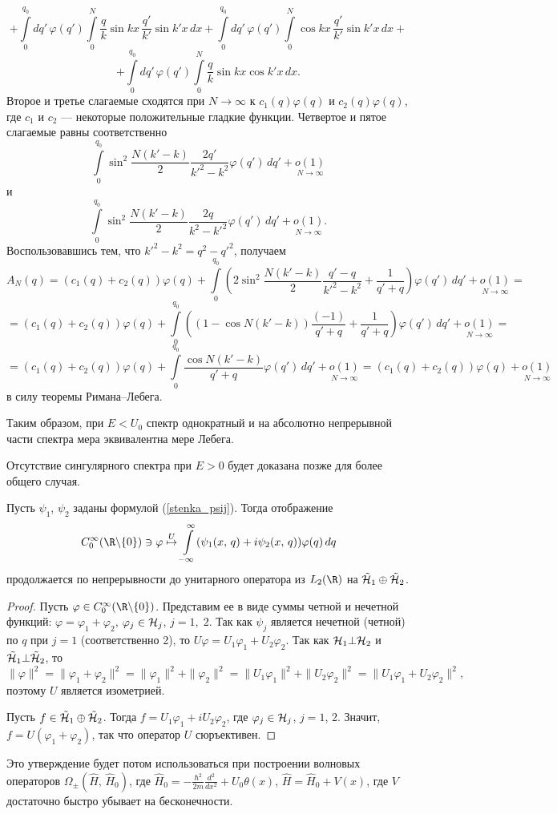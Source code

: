 \documentclass[a4paper
]{article}
\begin{document}
$$+\int \limits _0^{q_0}dq'\, \varphi(q')\int \limits_0^N \frac{q}{k}
\sin kx\, \frac{q'}{k'}\sin k'x\, dx+\int \limits _0^{q_0}dq'\, \varphi(q')
\int \limits_0^N \cos kx\, \frac{q'}{k'}\sin k'x\, dx+$$ $$+\int \limits
_0^{q_0}dq'\, \varphi(q')\int \limits_0^N \frac{q}{k}\sin kx\cos k'x\, dx.$$
Второе и третье слагаемые сходятся
при $N\rightarrow \infty$ к $c_1(q)\varphi(q)$ и $c_2(q)\varphi(q)$,
где $c_1$ и $c_2$ --- некоторые положительные гладкие функции.
Четвертое и пятое слагаемые равны соответственно $$\int \limits_0^{q_0}
\sin^2\frac{N(k'-k)}{2}\frac{2q'}{k'^2-k^2}\varphi(q')\, dq'+\underset{N\rightarrow
\infty}{o(1)}$$ и $$\int \limits_0^{q_0}\sin^2\frac{N(k'-k)}{2}
\frac{2q}{k^2-k'^2}\varphi(q')\, dq'+\underset{N\rightarrow \infty}{o(1)}.$$
Воспользовавшись тем, что $k'^2-k^2=q^2-q'^2$, получаем $$A_N(q)=(c_1(q)+c_2(q))
\varphi(q)+\int \limits_0^{q_0}\left(
2\sin^2\frac{N(k'-k)}{2}\frac{q'-q}{k'^2-k^2}+\frac{1}{q'+q}\right)
\varphi(q')\, dq'+\underset{N\rightarrow \infty}{o(1)}=$$ $$=(c_1(q)+c_2(q))
\varphi(q)+\int \limits_0^{q_0}\left((1-\cos N(k'-k))\frac{(-1)}{q'+q}+
\frac{1}{q'+q}\right)\varphi(q')\, dq'+\underset{N\rightarrow \infty}{o(1)}=$$
$$=(c_1(q)+c_2(q))\varphi(q)+\int \limits_0^{q_0}\frac{\cos N(k'-k)}{q'+q}\varphi(q')
\, dq'+\underset{N\rightarrow \infty}{o(1)}=(c_1(q)+c_2(q))\varphi(q)
+\underset{N\rightarrow \infty}{o(1)}$$ в силу теоремы Римана--Лебега. \par
Таким образом, при $E<U_0$ спектр однократный и на абсолютно непрерывной
части спектра мера эквивалентна мере Лебега. \par
Отсутствие сингулярного спектра при $E>0$ будет доказана позже для
более общего случая.
\begin{Sta}
\label{utv_stenka}
Пусть $\psi_1$, $\psi_2$ заданы формулой (\ref{stenka_psij}). Тогда
отображение $$C_0^\infty(\R\backslash\{0\})\ni\varphi\stackrel{U}
{\mapsto}\int \limits_{-\infty}^\infty (\psi_1(x, \, q)+i\psi_2(x, \, q))
\varphi(q)\, dq$$ продолжается по непрерывности до унитарного оператора
из $L_2(\R)$ на $\tilde{{\cal H}}_1\oplus \tilde{\cal{H}}_2$.
\end{Sta}
\begin{proof}
Пусть $\varphi\in C_0^\infty(\R\backslash\{0\})$. Представим ее в виде
суммы четной и нечетной функций: $\varphi=\varphi_1+\varphi_2$, $\varphi_j
\in {\cal H}_j$, $j=1, \; 2$. Так как $\psi_j$ является нечетной (четной)
по $q$ при $j=1$ (соответственно 2), то $U\varphi=U_1\varphi_1+U_2\varphi_2$.
Так как ${\cal H}_1\bot {\cal H}_2$ и $\tilde{\cal{H}}_1\bot \tilde{\cal{H}}
_2$, то $$\|\varphi\|^2=\|\varphi_1+\varphi_2\|^2=\|\varphi_1\|^2+
\|\varphi_2\|^2=\|U_1\varphi_1\|^2+\|U_2\varphi_2\|^2=\|U_1\varphi_1
+U_2\varphi_2\|^2,$$ поэтому $U$ является изометрией. \par
Пусть $f\in \tilde{\cal{H}}_1\oplus \tilde{\cal{H}}_2$. Тогда $f=U_1\varphi_1
+iU_2\varphi_2$, где $\varphi_j\in {\cal H}_j$, $j=1$, 2. Значит,
$f=U(\varphi_1+\varphi_2)$, так что оператор $U$ сюръективен.
\end{proof}
Это утверждение будет потом использоваться при построении волновых
операторов $\Omega_{\pm}(\hat H, \, \hat H_0)$, где $\hat H_0=
-\frac{\hbar^2}{2m}\frac{d^2}{dx^2}+U_0\theta(x)$, $\hat H=\hat H_0+
V(x)$, где $V$ достаточно быстро убывает на бесконечности.
\end{document}
